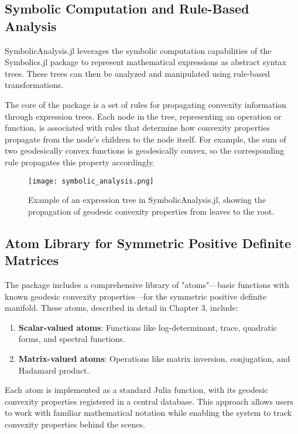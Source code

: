 \subsection{Symbolic Computation and Rule-Based Analysis}

SymbolicAnalysis.jl leverages the symbolic computation capabilities of the Symbolics.jl package to represent mathematical expressions as abstract syntax trees. These trees can then be analyzed and manipulated using rule-based transformations.

The core of the package is a set of rules for propagating convexity information through expression trees. Each node in the tree, representing an operation or function, is associated with rules that determine how convexity properties propagate from the node's children to the node itself. For example, the sum of two geodesically convex functions is geodesically convex, so the corresponding rule propagates this property accordingly.

\begin{figure}
\centering
\texttt{[image: symbolic\_analysis.png]}
\caption{Example of an expression tree in SymbolicAnalysis.jl, showing the propagation of geodesic convexity properties from leaves to the root.}
\label{fig:symbolic_analysis}
\end{figure}

\subsection{Atom Library for Symmetric Positive Definite Matrices}

The package includes a comprehensive library of "atoms"—basic functions with known geodesic convexity properties—for the symmetric positive definite manifold. These atoms, described in detail in Chapter 3, include:

\begin{enumerate}
\item \textbf{Scalar-valued atoms}: Functions like log-determinant, trace, quadratic forms, and spectral functions.

\item \textbf{Matrix-valued atoms}: Operations like matrix inversion, conjugation, and Hadamard product.
\end{enumerate}

Each atom is implemented as a standard Julia function, with its geodesic convexity properties registered in a central database. This approach allows users to work with familiar mathematical notation while enabling the system to track convexity properties behind the scenes.

